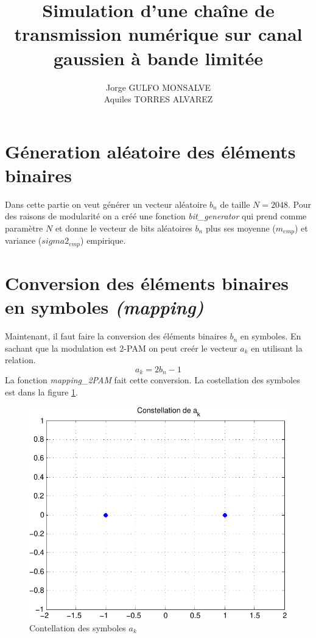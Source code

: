 \documentclass[a4paper,11pt]{article}
\title{Simulation d'une chaîne de transmission numérique sur canal gaussien à bande limitée\newline [Rapport]}
\author{Jorge GULFO MONSALVE\\Aquiles TORRES ALVAREZ}
\begin{document}
\maketitle

\section{Géneration aléatoire des éléments binaires}
Dans cette partie on veut générer un vecteur aléatoire $b_n$ de taille $N=2048$. Pour des raisons de modularité on a créé une fonction \emph{bit\_generator} qui prend comme paramètre $N$ et donne le vecteur de bits aléatoires $b_n$ plus ses moyenne ($m_{emp}$) et variance ($sigma2_{emp}$) empirique. 

\section{Conversion des éléments binaires en symboles \emph{(mapping)}}
Maintenant, il faut faire la conversion des éléments binaires $b_n$ en symboles. En sachant que la modulation est 2-PAM on peut creér le vecteur $a_k$ en utilisant la relation.
\[ a_k = 2b_n - 1\]
La fonction \emph{mapping\_2PAM } fait cette conversion. La costellation des symboles est dans la figure \ref{fig:sec1}.
\begin{figure}
	\begin{center}
	\includegraphics[scale=1]{contesllation_a_k-crop.pdf}
	\caption{Contellation des symboles $a_k$}
	\label{fig:sec1}
	\end{center}
\end{figure} 
\end{document}
